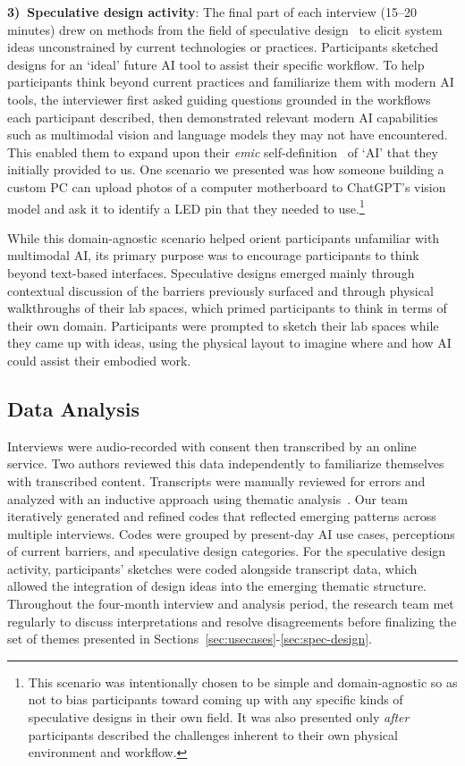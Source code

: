 \smallskip \noindent \textbf{3)~Speculative design activity}: The final part of each interview (15--20 minutes) drew on methods from the field of speculative design~\cite{auger2013speculative, hoffman2022speculative} to elicit system ideas  unconstrained by current technologies or practices. Participants sketched designs for an `ideal' future AI tool to assist their specific workflow.
%
To help participants think beyond current practices and familiarize them with modern AI tools, the interviewer first asked guiding questions grounded in the workflows each participant described, then demonstrated relevant modern AI capabilities such as multimodal vision and language models they may not have encountered. This enabled them to expand upon their \emph{emic} self-definition~\cite{emic_etic} of `AI' that they initially provided to us. One scenario we presented was how someone building a custom PC can upload photos of a computer motherboard to ChatGPT’s vision model and ask it to identify a LED pin that they needed to use.\footnote{This scenario was intentionally chosen to be simple and domain-agnostic so as not to bias participants toward coming up with any specific kinds of speculative designs in their own field. It was also presented only \emph{after} participants described the challenges inherent to their own physical environment and workflow.}

While this domain-agnostic scenario helped orient participants unfamiliar with multimodal AI, its primary purpose was to encourage participants to think beyond text-based interfaces. Speculative designs emerged mainly through contextual discussion of the barriers previously surfaced and through physical walkthroughs of their lab spaces, which primed participants to think in terms of their own domain. Participants were prompted to sketch their lab spaces while they came up with ideas, using the physical layout to imagine where and how AI could assist their embodied work.


\subsection{Data Analysis}

Interviews were audio-recorded with consent then transcribed by an online service. Two authors reviewed this data independently to familiarize themselves with transcribed content. Transcripts were manually reviewed for errors and analyzed with an inductive approach using thematic analysis~\cite{braun2006using}. Our team iteratively generated and refined codes that reflected emerging patterns across multiple interviews. Codes were grouped by present-day AI use cases, perceptions of current barriers, and speculative design categories. For the speculative design activity, participants' sketches were coded alongside transcript data, which allowed the integration of design ideas into the emerging thematic structure. Throughout the four-month interview and analysis period, the research team met regularly to discuss interpretations and resolve disagreements before finalizing the set of themes presented in Sections~\ref{sec:usecases}-\ref{sec:spec-design}.

